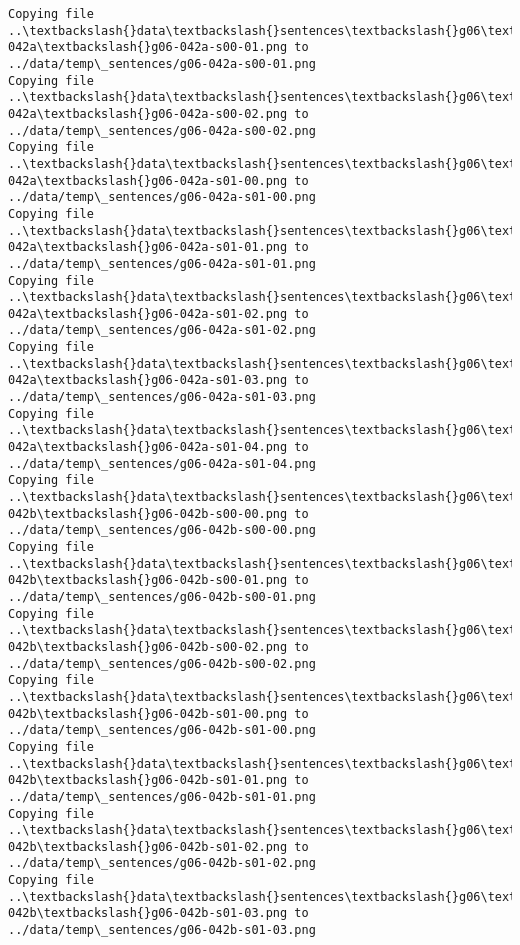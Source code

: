 \documentclass[11pt]{article}
\begin{document}
\begin{Verbatim}[commandchars=\\\{\}]
Copying file ..\textbackslash{}data\textbackslash{}sentences\textbackslash{}g06\textbackslash{}g06-042a\textbackslash{}g06-042a-s00-01.png to
../data/temp\_sentences/g06-042a-s00-01.png
Copying file ..\textbackslash{}data\textbackslash{}sentences\textbackslash{}g06\textbackslash{}g06-042a\textbackslash{}g06-042a-s00-02.png to
../data/temp\_sentences/g06-042a-s00-02.png
Copying file ..\textbackslash{}data\textbackslash{}sentences\textbackslash{}g06\textbackslash{}g06-042a\textbackslash{}g06-042a-s01-00.png to
../data/temp\_sentences/g06-042a-s01-00.png
Copying file ..\textbackslash{}data\textbackslash{}sentences\textbackslash{}g06\textbackslash{}g06-042a\textbackslash{}g06-042a-s01-01.png to
../data/temp\_sentences/g06-042a-s01-01.png
Copying file ..\textbackslash{}data\textbackslash{}sentences\textbackslash{}g06\textbackslash{}g06-042a\textbackslash{}g06-042a-s01-02.png to
../data/temp\_sentences/g06-042a-s01-02.png
Copying file ..\textbackslash{}data\textbackslash{}sentences\textbackslash{}g06\textbackslash{}g06-042a\textbackslash{}g06-042a-s01-03.png to
../data/temp\_sentences/g06-042a-s01-03.png
Copying file ..\textbackslash{}data\textbackslash{}sentences\textbackslash{}g06\textbackslash{}g06-042a\textbackslash{}g06-042a-s01-04.png to
../data/temp\_sentences/g06-042a-s01-04.png
Copying file ..\textbackslash{}data\textbackslash{}sentences\textbackslash{}g06\textbackslash{}g06-042b\textbackslash{}g06-042b-s00-00.png to
../data/temp\_sentences/g06-042b-s00-00.png
Copying file ..\textbackslash{}data\textbackslash{}sentences\textbackslash{}g06\textbackslash{}g06-042b\textbackslash{}g06-042b-s00-01.png to
../data/temp\_sentences/g06-042b-s00-01.png
Copying file ..\textbackslash{}data\textbackslash{}sentences\textbackslash{}g06\textbackslash{}g06-042b\textbackslash{}g06-042b-s00-02.png to
../data/temp\_sentences/g06-042b-s00-02.png
Copying file ..\textbackslash{}data\textbackslash{}sentences\textbackslash{}g06\textbackslash{}g06-042b\textbackslash{}g06-042b-s01-00.png to
../data/temp\_sentences/g06-042b-s01-00.png
Copying file ..\textbackslash{}data\textbackslash{}sentences\textbackslash{}g06\textbackslash{}g06-042b\textbackslash{}g06-042b-s01-01.png to
../data/temp\_sentences/g06-042b-s01-01.png
Copying file ..\textbackslash{}data\textbackslash{}sentences\textbackslash{}g06\textbackslash{}g06-042b\textbackslash{}g06-042b-s01-02.png to
../data/temp\_sentences/g06-042b-s01-02.png
Copying file ..\textbackslash{}data\textbackslash{}sentences\textbackslash{}g06\textbackslash{}g06-042b\textbackslash{}g06-042b-s01-03.png to
../data/temp\_sentences/g06-042b-s01-03.png

\end{Verbatim}
\end{document}
